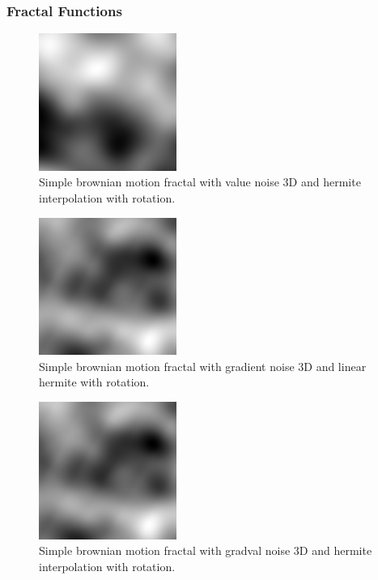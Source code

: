 \subsubsection{Fractal Functions}

\begin{figure}[h]
\centering
\includegraphics[width=0.4\textwidth]{out/simplefBm3/simplefBm3_value_noise3D_hermiteInterp_rot.png}
\caption{Simple brownian motion fractal with value noise 3D and hermite interpolation with rotation.}
\label{fig:simple_bm3_value_noise3D_hermiteInterp_rot}
\end{figure}

\begin{figure}[h]
\centering
\includegraphics[width=0.4\textwidth]{out/simplefBm3/simplefBm3_gradient_noise3D_hermiteInterp_rot.png}
\caption{Simple brownian motion fractal with gradient noise 3D and linear hermite with rotation.}
\label{fig:simple_bm3_gradient_noise3D_hermiteInterp_rot}
\end{figure}

\begin{figure}[h]
\centering
\includegraphics[width=0.4\textwidth]{out/simplefBm3/simplefBm3_gradval_noise3D_hermiteInterp_rot.png}
\caption{Simple brownian motion fractal with gradval noise 3D and hermite interpolation with rotation.}
\label{fig:simple_bm3_gradval_noise3D_hermiteInterp_rot}
\end{figure}

